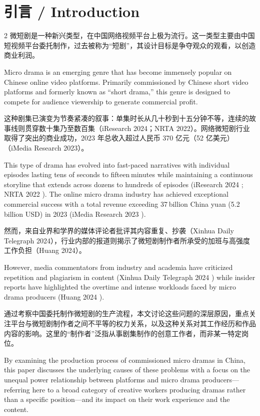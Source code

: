 \documentclass[10pt,a4paper]{article}
\begin{document}
\section*{引言 / Introduction}
\begin{paracol}{2}
微短剧是一种新兴类型，在中国网络视频平台上极为流行。这一类型主要由中国短视频平台委托制作，过去被称为“短剧”，其设计目标是争夺观众的观看，以创造商业利润。\par
\switchcolumn
Micro drama is an emerging genre that has become immensely popular on Chinese online video platforms. Primarily commissioned by Chinese short video platforms and formerly known as “short drama,” this genre is designed to compete for audience viewership to generate commercial profit.\par
\switchcolumn*
这种剧集已演变为节奏紧凑的叙事：单集时长从几十秒到十五分钟不等，连续的故事线则贯穿数十集乃至数百集（iResearch 2024；NRTA 2022）。网络微短剧行业取得了突出的商业成功，2023 年总收入超过人民币 370 亿元（52 亿美元）（iMedia Research 2023）。\par
\switchcolumn
This type of drama has evolved into fast-paced narratives with individual episodes lasting tens of seconds to fifteen minutes while maintaining a continuous storyline that extends across dozens to hundreds of episodes (iResearch 2024 ; NRTA 2022 ). The online micro drama industry has achieved exceptional commercial success with a total revenue exceeding 37 billion China yuan (5.2 billion USD) in 2023 (iMedia Research 2023 ).\par
\switchcolumn*
然而，来自业界和学界的媒体评论者批评其内容重复、抄袭（Xinhua Daily Telegraph 2024），行业内部的报道则揭示了微短剧制作者所承受的加班与高强度工作负担（Huang 2024）。\par
\switchcolumn
However, media commentators from industry and academia have criticized repetition and plagiarism in content (Xinhua Daily Telegraph 2024 ) while insider reports have highlighted the overtime and intense workloads faced by micro drama producers (Huang 2024 ).\par
\switchcolumn*
通过考察中国委托制作微短剧的生产流程，本文讨论这些问题的深层原因，重点关注平台与微短剧制作者之间不平等的权力关系，以及这种关系对其工作经历和作品内容的影响。这里的“制作者”泛指从事剧集制作的创意工作者，而非某一特定岗位。\par
\switchcolumn
By examining the production process of commissioned micro dramas in China, this paper discusses the underlying causes of these problems with a focus on the unequal power relationship between platforms and micro drama producers—referring here to a broad category of creative workers producing dramas rather than a specific position—and its impact on their work experience and the content.\par

\end{paracol}
\end{document}
